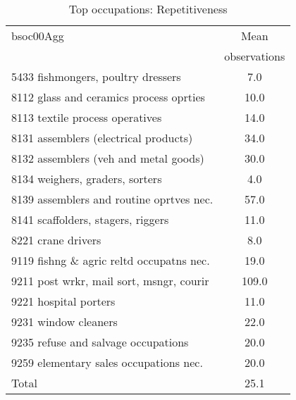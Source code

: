 \begin{table}
	\centering
	\caption{Top occupations: Repetitiveness}
	\begin{tabular}{lc}
	\toprule	
		
bsoc00Agg&Mean \\
&observations \\
\hline
5433 fishmongers, poultry dressers&7.0 \\
8112 glass and ceramics process oprties&10.0 \\
8113 textile process operatives&14.0 \\
8131 assemblers (electrical products)&34.0 \\
8132 assemblers (veh and metal goods)&30.0 \\
8134 weighers, graders, sorters&4.0 \\
8139 assemblers and routine oprtves nec.&57.0 \\
8141 scaffolders, stagers, riggers&11.0 \\
8221 crane drivers&8.0 \\
9119 fishng \& agric reltd occupatns nec.&19.0 \\
9211 post wrkr, mail sort, msngr, courir&109.0 \\
9221 hospital porters&11.0 \\
9231 window cleaners&22.0 \\
9235 refuse and salvage occupations&20.0 \\
9259 elementary sales occupations nec.&20.0 \\
Total&25.1 \\
\bottomrule
\bottomrule
\end{tabular}
\end{table}
